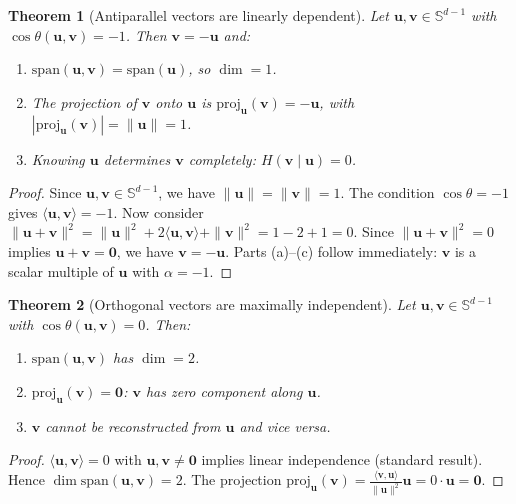 \documentclass[11pt,a4paper]{article}
\newtheorem{theorem}{Theorem}
\theoremstyle{remark}
\begin{document}
\begin{theorem}[Antiparallel vectors are linearly dependent]
\label{thm:antiparallel}
Let $\mathbf{u}, \mathbf{v} \in \mathbb{S}^{d-1}$ with $\cos\theta(\mathbf{u}, \mathbf{v}) = -1$.
Then $\mathbf{v} = -\mathbf{u}$ and:
\begin{enumerate}[label=(\alph*)]
  \item $\mathrm{span}(\mathbf{u}, \mathbf{v}) = \mathrm{span}(\mathbf{u})$, so $\dim = 1$.
  \item The projection of $\mathbf{v}$ onto $\mathbf{u}$ is $\mathrm{proj}_\mathbf{u}(\mathbf{v}) = -\mathbf{u}$, with $|\mathrm{proj}_\mathbf{u}(\mathbf{v})| = \|\mathbf{u}\| = 1$.
  \item Knowing $\mathbf{u}$ determines $\mathbf{v}$ completely: $H(\mathbf{v} \mid \mathbf{u}) = 0$.
\end{enumerate}
\end{theorem}

\begin{proof}
Since $\mathbf{u}, \mathbf{v} \in \mathbb{S}^{d-1}$, we have $\|\mathbf{u}\| = \|\mathbf{v}\| = 1$.
The condition $\cos\theta = -1$ gives $\langle\mathbf{u}, \mathbf{v}\rangle = -1$.
Now consider $\|\mathbf{u} + \mathbf{v}\|^2 = \|\mathbf{u}\|^2 + 2\langle\mathbf{u}, \mathbf{v}\rangle + \|\mathbf{v}\|^2 = 1 - 2 + 1 = 0$.
Since $\|\mathbf{u} + \mathbf{v}\|^2 = 0$ implies $\mathbf{u} + \mathbf{v} = \mathbf{0}$, we have $\mathbf{v} = -\mathbf{u}$.
Parts (a)--(c) follow immediately: $\mathbf{v}$ is a scalar multiple of $\mathbf{u}$ with $\alpha = -1$.
\end{proof}

\begin{theorem}[Orthogonal vectors are maximally independent]
\label{thm:orthogonal}
Let $\mathbf{u}, \mathbf{v} \in \mathbb{S}^{d-1}$ with $\cos\theta(\mathbf{u}, \mathbf{v}) = 0$. Then:
\begin{enumerate}[label=(\alph*)]
  \item $\mathrm{span}(\mathbf{u}, \mathbf{v})$ has $\dim = 2$.
  \item $\mathrm{proj}_\mathbf{u}(\mathbf{v}) = \mathbf{0}$: $\mathbf{v}$ has zero component along $\mathbf{u}$.
  \item $\mathbf{v}$ cannot be reconstructed from $\mathbf{u}$ and vice versa.
\end{enumerate}
\end{theorem}

\begin{proof}
$\langle\mathbf{u}, \mathbf{v}\rangle = 0$ with $\mathbf{u}, \mathbf{v} \neq \mathbf{0}$ implies linear independence (standard result).
Hence $\dim\mathrm{span}(\mathbf{u}, \mathbf{v}) = 2$.
The projection $\mathrm{proj}_\mathbf{u}(\mathbf{v}) = \frac{\langle\mathbf{v}, \mathbf{u}\rangle}{\|\mathbf{u}\|^2}\mathbf{u} = 0 \cdot \mathbf{u} = \mathbf{0}$.
\end{proof}
\end{document}
